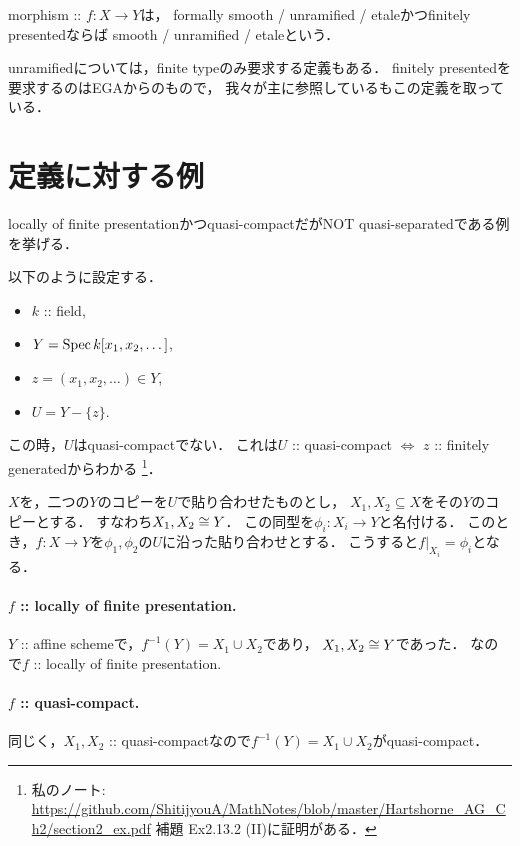 \documentclass[a4paper]{jsarticle}
\begin{document}
\begin{Def}
    morphism :: $f \colon X \to Y$は，
    formally smooth / unramified / etaleかつfinitely presentedならば
    smooth / unramified / etaleという．
\end{Def}
unramifiedについては，finite typeのみ要求する定義もある．
finitely presentedを要求するのはEGAからのもので，
我々が主に参照している\cite{ASS}もこの定義を取っている．

\section{定義に対する例}

\begin{Example}\label{example:not_qsep}
    locally of finite presentationかつquasi-compactだがNOT quasi-separatedである例を挙げる．

    以下のように設定する．
    \begin{itemize}
        \item $k$ :: field,
        \item $Y=\operatorname{Spec} k[x_1,x_2,\dots]$,
        \item $z=(x_1, x_2, \dots) \in Y$,
        \item $U=Y-\{z\}$.
    \end{itemize}
    この時，$U$はquasi-compactでない．
    これは$U$ :: quasi-compact $\iff$ $z$ :: finitely generatedからわかる
    \footnote
        {
            私のノート: \url{https://github.com/ShitijyouA/MathNotes/blob/master/Hartshorne_AG_Ch2/section2_ex.pdf}
            補題 Ex2.13.2 (II)に証明がある．
        }．

    $X$を，二つの$Y$のコピーを$U$で貼り合わせたものとし，
    $X_1, X_2 \subseteq X$をその$Y$のコピーとする．
    すなわち$X_1, X_2 \cong Y$．
    この同型を$\phi_i \colon X_i \to Y$と名付ける．
    このとき，$f \colon X \to Y$を$\phi_1, \phi_2$の$U$に沿った貼り合わせとする．
    こうすると$f|_{X_i}=\phi_i$となる．

    \paragraph{$f$ :: locally of finite presentation.}
    $Y$ :: affine schemeで，$f^{-1}(Y)=X_1 \cup X_2$であり，
    $X_1, X_2 \cong Y$であった．
    なので$f$ :: locally of finite presentation.

    \paragraph{$f$ :: quasi-compact.}
    同じく，$X_1, X_2$ :: quasi-compactなので$f^{-1}(Y)=X_1 \cup X_2$がquasi-compact．


\end{Example}
\end{document}
